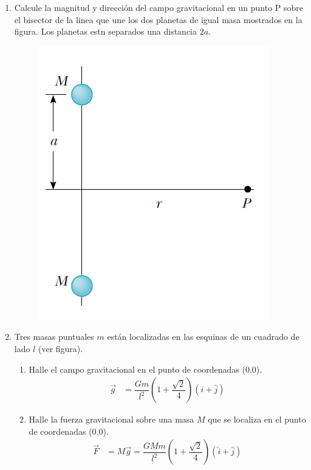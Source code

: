 \documentclass[11pt,twocolumn]{article}
\begin{document}
\begin{enumerate}
\item Calcule la magnitud y dirección del campo gravitacional en un punto P sobre el bisector de la linea que une los dos planetas de igual masa mostrados en la figura. Los planetas estn separados una distancia $2a$.
\begin{figure}[h]
\centering
\includegraphics[scale=0.4]{fig6}
\end{figure}

\item Tres masas puntuales $m$ están localizadas en las esquinas de un cuadrado de lado $l$ (ver figura). 
\begin{enumerate}
\item Halle el campo gravitacional en el punto de coordenadas (0,0).
\begin{align*}
\vec{g}&=\dfrac{Gm}{l^2}\left(1+\dfrac{\sqrt{2}}{4}\right)\left(\hat{i}+\hat{j}\right)
\end{align*}
\item Halle la fuerza gravitacional sobre una masa $M$ que se localiza en el punto de coordenadas (0,0).
\begin{align*}
\vec{F}&= M\vec{g}=\dfrac{GMm}{l^2}\left(1+\dfrac{\sqrt{2}}{4}\right)\left(\hat{i}+\hat{j}\right)
\end{align*}
\end{enumerate}


\end{enumerate}
\end{document}
